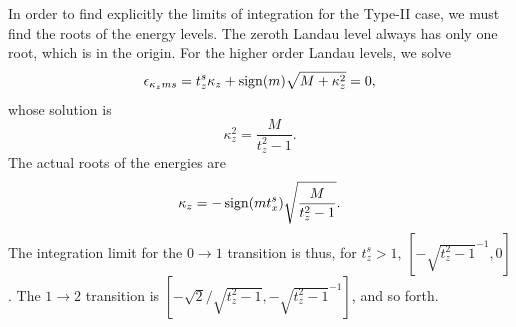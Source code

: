 
In order to find explicitly the limits of integration for the Type-II case, we must find the roots of the energy levels.
The zeroth Landau level always has only one root, which is in the origin.
For the higher order Landau levels, we solve
\begin{equation}
  \label{eq:93}
  \epsilon_{\kappa_z m s } = t_z^s \kappa_z + \operatorname{sign}(m) \sqrt{M + \kappa_{z} ^2} = 0,
\end{equation}
whose solution is
\[
\kappa_z^2 = \frac{M}{t_{z}^2 - 1}.
\]
The actual roots of the energies are
\begin{equation}
  \label{eq:94}
  \kappa_z = -\operatorname{sign}(m t^s_x) \sqrt{\frac{M}{t_{z}^2 - 1}}.
\end{equation}
The integration limit for the \( 0 \to 1 \) transition is thus, for \( t_z^s > 1 \), \( [-\sqrt{t_z^2 - 1 }^{-1}, 0] \).
The \( 1\to 2 \) transition is \( [-\sqrt{2} /\sqrt{t_z^2 - 1}, -\sqrt{t_z^2 - 1 }^{-1}] \), and so forth.

